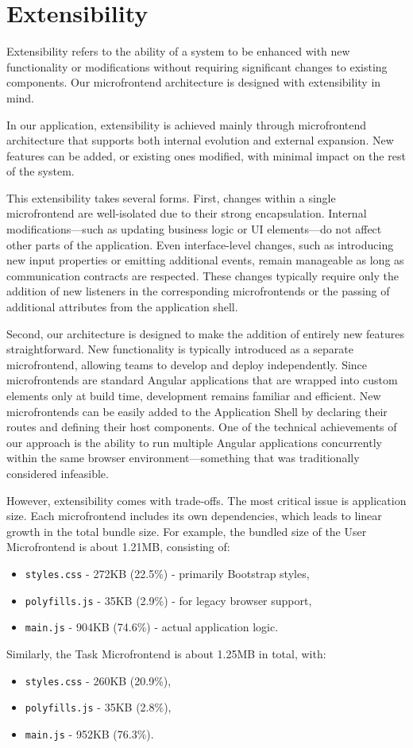 \section{Extensibility}
Extensibility refers to the ability of a system to be enhanced with new functionality or modifications without requiring significant changes to existing components. Our microfrontend architecture is designed with extensibility in mind.

In our application, extensibility is achieved mainly through microfrontend architecture that supports both internal evolution and external expansion. New features can be added, or existing ones modified, with minimal impact on the rest of the system.

This extensibility takes several forms. First, changes within a single microfrontend are well-isolated due to their strong encapsulation. Internal modifications—such as updating business logic or UI elements—do not affect other parts of the application. Even interface-level changes, such as introducing new input properties or emitting additional events, remain manageable as long as communication contracts are respected. These changes typically require only the addition of new listeners in the corresponding microfrontends or the passing of additional attributes from the application shell.

Second, our architecture is designed to make the addition of entirely new features straightforward. New functionality is typically introduced as a separate microfrontend, allowing teams to develop and deploy independently. Since microfrontends are standard Angular applications that are wrapped into custom elements only at build time, development remains familiar and efficient. New microfrontends can be easily added to the Application Shell by declaring their routes and defining their host components. One of the technical achievements of our approach is the ability to run multiple Angular applications concurrently within the same browser environment—something that was traditionally considered infeasible.

However, extensibility comes with trade-offs. The most critical issue is application size. Each microfrontend includes its own dependencies, which leads to linear growth in the total bundle size. For example, the bundled size of the User Microfrontend is about 1.21MB, consisting of:
\begin{itemize}
    \item \texttt{styles.css} - 272KB (22.5\%) - primarily Bootstrap styles,
    \item \texttt{polyfills.js} - 35KB (2.9\%) - for legacy browser support,
    \item \texttt{main.js} - 904KB (74.6\%) - actual application logic.
\end{itemize}
Similarly, the Task Microfrontend is about 1.25MB in total, with:
\begin{itemize}
    \item \texttt{styles.css} - 260KB (20.9\%),
    \item \texttt{polyfills.js} - 35KB (2.8\%),
    \item \texttt{main.js} - 952KB (76.3\%).
\end{itemize}


